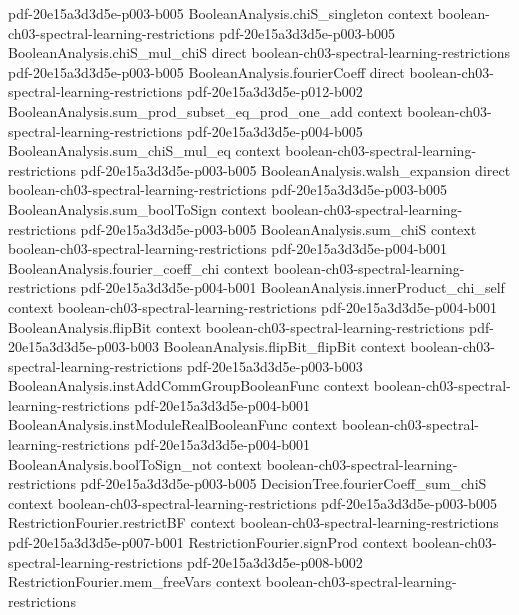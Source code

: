\begin{theorem}
  {pdf-20e15a3d3d5e-p003-b005}
\proofstep
  {BooleanAnalysis.chiS_singleton}
  {context}
  {boolean-ch03-spectral-learning-restrictions}
  {pdf-20e15a3d3d5e-p003-b005}
\proofstep
  {BooleanAnalysis.chiS_mul_chiS}
  {direct}
  {boolean-ch03-spectral-learning-restrictions}
  {pdf-20e15a3d3d5e-p003-b005}
\proofstep
  {BooleanAnalysis.fourierCoeff}
  {direct}
  {boolean-ch03-spectral-learning-restrictions}
  {pdf-20e15a3d3d5e-p012-b002}
\proofstep
  {BooleanAnalysis.sum_prod_subset_eq_prod_one_add}
  {context}
  {boolean-ch03-spectral-learning-restrictions}
  {pdf-20e15a3d3d5e-p004-b005}
\proofstep
  {BooleanAnalysis.sum_chiS_mul_eq}
  {context}
  {boolean-ch03-spectral-learning-restrictions}
  {pdf-20e15a3d3d5e-p003-b005}
\proofstep
  {BooleanAnalysis.walsh_expansion}
  {direct}
  {boolean-ch03-spectral-learning-restrictions}
  {pdf-20e15a3d3d5e-p003-b005}
\proofstep
  {BooleanAnalysis.sum_boolToSign}
  {context}
  {boolean-ch03-spectral-learning-restrictions}
  {pdf-20e15a3d3d5e-p003-b005}
\proofstep
  {BooleanAnalysis.sum_chiS}
  {context}
  {boolean-ch03-spectral-learning-restrictions}
  {pdf-20e15a3d3d5e-p004-b001}
\proofstep
  {BooleanAnalysis.fourier_coeff_chi}
  {context}
  {boolean-ch03-spectral-learning-restrictions}
  {pdf-20e15a3d3d5e-p004-b001}
\proofstep
  {BooleanAnalysis.innerProduct_chi_self}
  {context}
  {boolean-ch03-spectral-learning-restrictions}
  {pdf-20e15a3d3d5e-p004-b001}
\proofstep
  {BooleanAnalysis.flipBit}
  {context}
  {boolean-ch03-spectral-learning-restrictions}
  {pdf-20e15a3d3d5e-p003-b003}
\proofstep
  {BooleanAnalysis.flipBit_flipBit}
  {context}
  {boolean-ch03-spectral-learning-restrictions}
  {pdf-20e15a3d3d5e-p003-b003}
\proofstep
  {BooleanAnalysis.instAddCommGroupBooleanFunc}
  {context}
  {boolean-ch03-spectral-learning-restrictions}
  {pdf-20e15a3d3d5e-p004-b001}
\proofstep
  {BooleanAnalysis.instModuleRealBooleanFunc}
  {context}
  {boolean-ch03-spectral-learning-restrictions}
  {pdf-20e15a3d3d5e-p004-b001}
\proofstep
  {BooleanAnalysis.boolToSign_not}
  {context}
  {boolean-ch03-spectral-learning-restrictions}
  {pdf-20e15a3d3d5e-p003-b005}
\proofstep
  {DecisionTree.fourierCoeff_sum_chiS}
  {context}
  {boolean-ch03-spectral-learning-restrictions}
  {pdf-20e15a3d3d5e-p003-b005}
\proofstep
  {RestrictionFourier.restrictBF}
  {context}
  {boolean-ch03-spectral-learning-restrictions}
  {pdf-20e15a3d3d5e-p007-b001}
\proofstep
  {RestrictionFourier.signProd}
  {context}
  {boolean-ch03-spectral-learning-restrictions}
  {pdf-20e15a3d3d5e-p008-b002}
\proofstep
  {RestrictionFourier.mem_freeVars}
  {context}
  {boolean-ch03-spectral-learning-restrictions}

\end{theorem}
